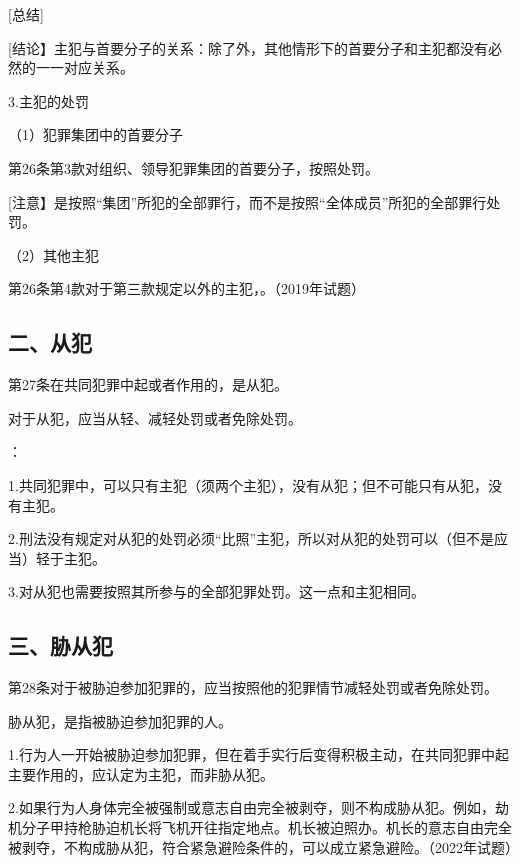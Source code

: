 [总结]


[结论】主犯与首要分子的关系：除了外，其他情形下的首要分子和主犯都没有必然的一一对应关系。

3.主犯的处罚

（1）犯罪集团中的首要分子

第26条第3款对组织、领导犯罪集团的首要分子，按照处罚。

[注意】是按照“集团”所犯的全部罪行，而不是按照“全体成员”所犯的全部罪行处罚。

（2）其他主犯

第26条第4款对于第三款规定以外的主犯，。（2019年试题）

\subsection*{二、从犯}

第27条在共同犯罪中起或者作用的，是从犯。

对于从犯，应当从轻、减轻处罚或者免除处罚。

：

1.共同犯罪中，可以只有主犯（须两个主犯），没有从犯；但不可能只有从犯，没有主犯。

2.刑法没有规定对从犯的处罚必须“比照”主犯，所以对从犯的处罚可以（但不是应当）轻于主犯。

3.对从犯也需要按照其所参与的全部犯罪处罚。这一点和主犯相同。

\subsection*{三、胁从犯}

第28条对于被胁迫参加犯罪的，应当按照他的犯罪情节减轻处罚或者免除处罚。

胁从犯，是指被胁迫参加犯罪的人。

1.行为人一开始被胁迫参加犯罪，但在着手实行后变得积极主动，在共同犯罪中起主要作用的，应认定为主犯，而非胁从犯。

2.如果行为人身体完全被强制或意志自由完全被剥夺，则不构成胁从犯。例如，劫机分子甲持枪胁迫机长将飞机开往指定地点。机长被迫照办。机长的意志自由完全被剥夺，不构成胁从犯，符合紧急避险条件的，可以成立紧急避险。（2022年试题）

